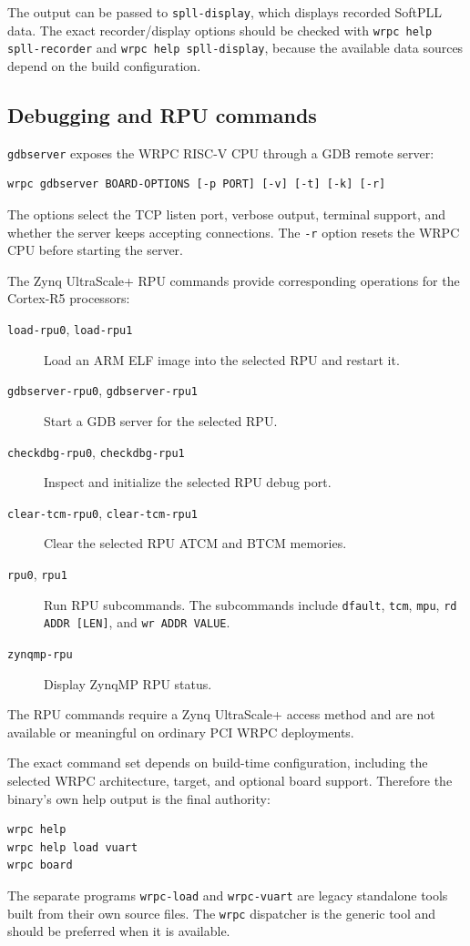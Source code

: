 \documentclass[a4paper,12pt]{article}
\begin{document}
The output can be passed to \texttt{spll-display}, which displays recorded
SoftPLL data. The exact recorder/display options should be checked with
\texttt{wrpc help spll-recorder} and \texttt{wrpc help spll-display}, because
the available data sources depend on the build configuration.

\subsection{Debugging and RPU commands}

\texttt{gdbserver} exposes the WRPC RISC-V CPU through a GDB remote server:

\begin{lstlisting}
wrpc gdbserver BOARD-OPTIONS [-p PORT] [-v] [-t] [-k] [-r]
\end{lstlisting}

The options select the TCP listen port, verbose output, terminal support, and
whether the server keeps accepting connections. The \texttt{-r} option resets
the WRPC CPU before starting the server.

The Zynq UltraScale+ RPU commands provide corresponding operations for the
Cortex-R5 processors:

\begin{description}
\item[\texttt{load-rpu0}, \texttt{load-rpu1}] Load an ARM ELF image into the
  selected RPU and restart it.
\item[\texttt{gdbserver-rpu0}, \texttt{gdbserver-rpu1}] Start a GDB server
  for the selected RPU.
\item[\texttt{checkdbg-rpu0}, \texttt{checkdbg-rpu1}] Inspect and initialize
  the selected RPU debug port.
\item[\texttt{clear-tcm-rpu0}, \texttt{clear-tcm-rpu1}] Clear the selected
  RPU ATCM and BTCM memories.
\item[\texttt{rpu0}, \texttt{rpu1}] Run RPU subcommands. The subcommands
  include \texttt{dfault}, \texttt{tcm}, \texttt{mpu},
  \texttt{rd ADDR [LEN]}, and \texttt{wr ADDR VALUE}.
\item[\texttt{zynqmp-rpu}] Display ZynqMP RPU status.
\end{description}

The RPU commands require a Zynq UltraScale+ access method and are not
available or meaningful on ordinary PCI WRPC deployments.

The exact command set depends on build-time configuration, including the
selected WRPC architecture, target, and optional board support. Therefore the
binary's own help output is the final authority:

\begin{lstlisting}
wrpc help
wrpc help load vuart
wrpc board
\end{lstlisting}

The separate programs \texttt{wrpc-load} and \texttt{wrpc-vuart} are legacy
standalone tools built from their own source files. The \texttt{wrpc}
dispatcher is the generic tool and should be preferred when it is available.

\ifwrpctoolstandalone
\end{document}
